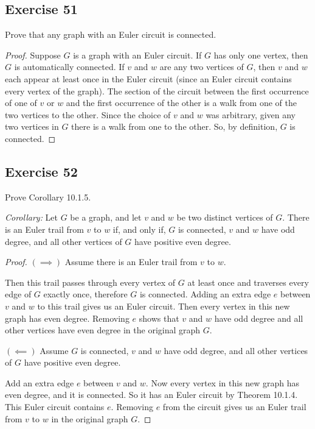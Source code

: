 \documentclass[14pt]{extarticle}
\begin{document}
\subsection{Exercise 51}
Prove that any graph with an Euler circuit is connected.

\begin{proof}
Suppose \(G\) is a graph with an Euler circuit. If \(G\) has only one vertex, then \(G\) is automatically connected. If 
\(v\) and \(w\) are any two vertices of \(G\), then \(v\) and \(w\) each appear at least once in the Euler circuit (since an 
Euler circuit contains every vertex of the graph). The section of the circuit between the first occurrence of one of \(v\) or 
\(w\) and the first occurrence of the other is a walk from one of the two vertices to the other. Since the choice of \(v\) 
and \(w\) was arbitrary, given any two vertices in \(G\) there is a walk from one to the other. So, by definition, 
\(G\) is connected.
\end{proof}

\subsection{Exercise 52}
Prove Corollary 10.1.5.

{\it Corollary:} Let \(G\) be a graph, and let \(v\) and \(w\) be two distinct vertices of \(G\). There is an Euler trail 
from \(v\) to \(w\) if, and only if, \(G\) is connected, \(v\) and \(w\) have odd degree, and all other vertices of \(G\) 
have positive even degree.

\begin{proof}
\(\bm{(\implies)}\) Assume there is an Euler trail from \(v\) to \(w\). 

Then this trail passes through every vertex of \(G\) at least once and traverses every edge of \(G\) exactly once, therefore 
\(G\) is connected. Adding an extra edge \(e\) between \(v\) and \(w\) to this trail gives us an Euler circuit. Then every 
vertex in this new graph has even degree. Removing \(e\) shows that \(v\) and \(w\) have odd degree and all other vertices 
have even degree in the original graph \(G\).

\(\bm{(\impliedby)}\) Assume \(G\) is connected, \(v\) and \(w\) have odd degree, and all other vertices of \(G\) have 
positive even degree.

Add an extra edge \(e\) between \(v\) and \(w\). Now every vertex in this new graph has even degree, and it is connected.
So it has an Euler circuit by Theorem 10.1.4. This Euler circuit contains \(e\). Removing \(e\) from the circuit gives
us an Euler trail from \(v\) to \(w\) in the original graph \(G\).
\end{proof}
\end{document}
